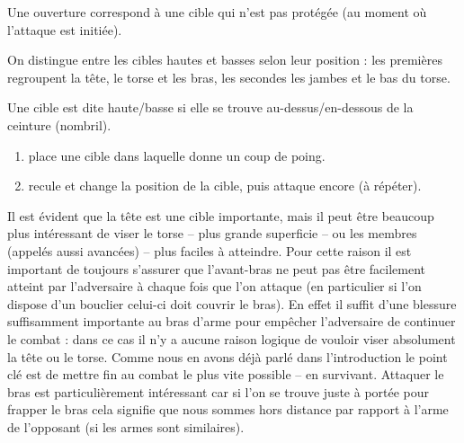 \begin{definition}[Ouverture]

	Une ouverture correspond à une cible qui n'est pas protégée (au moment où l'attaque est initiée).
\end{definition}


On distingue entre les cibles hautes et basses selon leur position : les premières regroupent la tête, le torse et les bras, les secondes les jambes et le bas du torse.


\begin{definition}

	Une cible est dite haute/basse si elle se trouve au-dessus/en-dessous de la ceinture (nombril).
\end{definition}


\begin{exercice}


	
	\begin{enumerate}
		\item \D place une cible dans laquelle \A donne un coup de poing.
		
		\item \D recule et change la position de la cible, puis \A attaque encore (à répéter).
	\end{enumerate}
\end{exercice}


Il est évident que la tête est une cible importante, mais il peut être beaucoup plus intéressant de viser le torse -- plus grande superficie -- ou les membres (appelés aussi avancées) -- plus faciles à atteindre.
Pour cette raison il est important de toujours s'assurer que l'avant-bras ne peut pas être facilement atteint par l'adversaire à chaque fois que l'on attaque (en particulier si l'on dispose d'un bouclier celui-ci doit couvrir le bras).
En effet il suffit d'une blessure suffisamment importante au bras d'arme pour empêcher l'adversaire de continuer le combat : dans ce cas il n'y a aucune raison logique de vouloir viser absolument la tête ou le torse.
Comme nous en avons déjà parlé dans l'introduction le point clé est de mettre fin au combat le plus vite possible -- en survivant.
Attaquer le bras est particulièrement intéressant car si l'on se trouve juste à portée pour frapper le bras cela signifie que nous sommes hors distance par rapport à l'arme de l'opposant (si les armes sont similaires).


